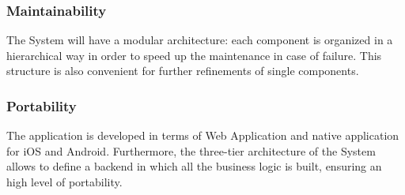 \subsubsection{Maintainability}
The System will have a modular architecture: each component is organized in a hierarchical way in order to speed up the maintenance in case of failure. This structure is also convenient for further refinements of single components.

\subsubsection{Portability}
The application is developed in terms of Web Application and native application for iOS and Android. Furthermore, the three-tier architecture of the System allows to define a backend in which all the business logic is built, ensuring an high level of portability.

